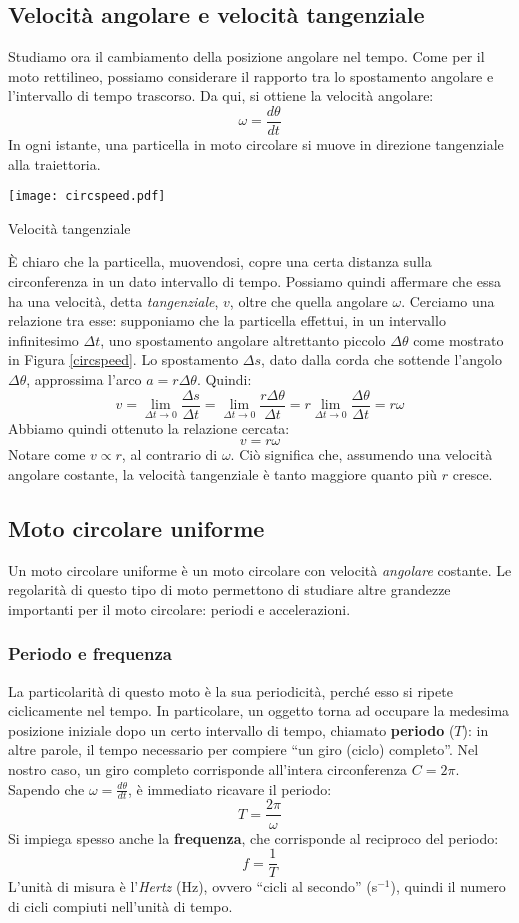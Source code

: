 \subsection{Velocità angolare e velocità tangenziale}
Studiamo ora il cambiamento della posizione angolare nel tempo. Come per il
moto rettilineo, possiamo considerare il rapporto tra lo spostamento angolare
e l'intervallo di tempo trascorso. Da qui, si ottiene la velocità angolare:
\[ \omega = \frac{d\theta}{dt} \]
In ogni istante, una particella in moto circolare si muove in direzione
tangenziale alla traiettoria.
\begin{marginfigure}
    \centering
    \texttt{[image: circspeed.pdf]}
    \caption{Velocità tangenziale}
    \label{circspeed}
\end{marginfigure}
È chiaro che la particella, muovendosi, copre una certa distanza sulla
circonferenza in un dato intervallo di tempo. Possiamo quindi affermare
che essa ha una velocità, detta \textit{tangenziale}, $v$, oltre che
quella angolare $\omega$. Cerciamo una relazione tra esse: supponiamo che
la particella effettui, in un intervallo infinitesimo $\Delta t$, uno
spostamento angolare altrettanto piccolo $\Delta\theta$ come mostrato in
Figura \ref{circspeed}. Lo spostamento $\Delta s$, dato dalla corda che
sottende l'angolo $\Delta\theta$, approssima l'arco $a = r\Delta\theta$. Quindi:
\[ v = \lim_{\Delta t \to 0}\frac{\Delta s}{\Delta t} = \lim_{\Delta t \to 0} \frac{r\Delta\theta}{\Delta t} = r\lim_{\Delta t \to 0}\frac{\Delta\theta}{\Delta t} = r\omega \]
Abbiamo quindi ottenuto la relazione cercata:
\[ v = r\omega \]
Notare come $v\propto r$, al contrario di $\omega$. Ciò significa che,
assumendo una velocità angolare costante, la velocità tangenziale è tanto
maggiore quanto più $r$ cresce.

\subsection{Moto circolare uniforme}
Un moto circolare uniforme è un moto circolare con velocità \textit{angolare} costante.
Le regolarità di questo tipo di moto permettono di studiare altre grandezze
importanti per il moto circolare: periodi e accelerazioni.

\subsubsection*{Periodo e frequenza}
La particolarità di questo moto è la sua periodicità, perché esso si ripete
ciclicamente nel tempo. In particolare, un oggetto torna ad occupare la medesima
posizione iniziale dopo un certo intervallo di tempo, chiamato \textbf{periodo} ($T$):
in altre parole, il tempo necessario per compiere ``un giro (ciclo) completo''.
Nel nostro caso, un giro completo corrisponde all'intera circonferenza $C = 2\pi$.
Sapendo che $\omega = \frac{d\theta}{dt}$, è immediato ricavare il periodo:
\[ T = \frac{2\pi}{\omega} \]
Si impiega spesso anche la \textbf{frequenza}, che corrisponde al reciproco
del periodo:
\[ f = \frac{1}{T} \]
L'unità di misura è l'\textit{Hertz} (Hz), ovvero ``cicli al secondo'' (s$^{-1}$),
quindi il numero di cicli compiuti nell'unità di tempo.

